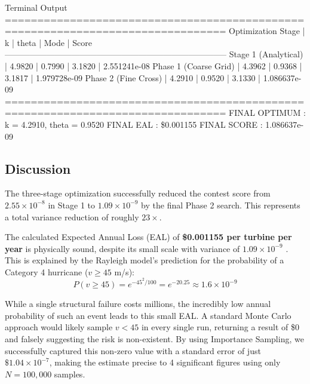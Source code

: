 \documentclass{article}
\begin{document}
\begin{outputbox}{Terminal Output}
================================================================================
Optimization Stage        | k        | theta    | Mode     | Score
--------------------------------------------------------------------------------
Stage 1 (Analytical)      | 4.9820   | 0.7990   | 3.1820   |    2.551241e-08
Phase 1 (Coarse Grid)     | 4.3962   | 0.9368   | 3.1817   |    1.979728e-09
Phase 2 (Fine Cross)      | 4.2910   | 0.9520   | 3.1330   |    1.086637e-09
================================================================================
FINAL OPTIMUM : k = 4.2910, theta = 0.9520
FINAL EAL     : \$0.001155
FINAL SCORE   : 1.086637e-09
\end{outputbox}
\subsection*{Discussion}
The three-stage optimization successfully reduced the contest score from $2.55 \times 10^{-8}$ in Stage 1 to $1.09 \times 10^{-9}$ by the final Phase 2 search. This represents a total variance reduction of roughly $23\times$.

The calculated Expected Annual Loss (EAL) of \textbf{\$0.001155 per turbine per year} is physically sound, despite its small scale with variance of \textbf{$1.09 \times 10^{-9}$} . This is explained by the Rayleigh model's prediction for the probability of a Category 4 hurricane ($v \geq 45$ m/s):
\[
P(v \geq 45) = e^{-45^2/100} = e^{-20.25} \approx 1.6 \times 10^{-9}
\]

While a single structural failure costs millions, the incredibly low annual probability of such an event leads to this small EAL. A standard Monte Carlo approach would likely sample $v < 45$ in every single run, returning a result of \$0 and falsely suggesting the risk is non-existent. By using Importance Sampling, we successfully captured this non-zero value with a standard error of just $\$1.04 \times 10^{-7}$, making the estimate precise to 4 significant figures using only $N = 100,000$ samples.
\end{document}

